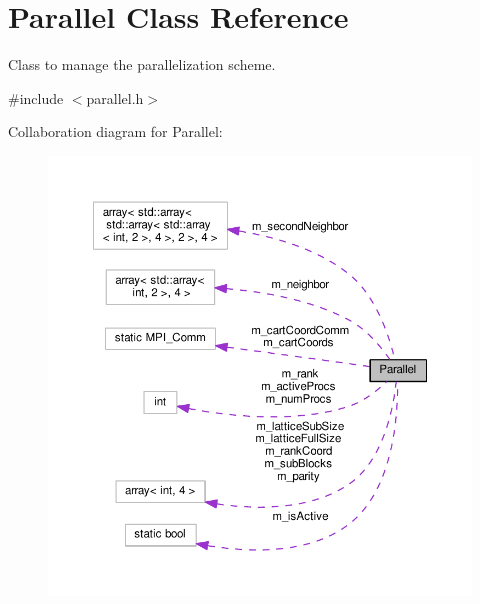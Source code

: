 \hypertarget{classParallel}{}\section{Parallel Class Reference}
\label{classParallel}


Class to manage the parallelization scheme.  




{\ttfamily \#include $<$parallel.\+h$>$}



Collaboration diagram for Parallel\+:\nopagebreak
\begin{figure}[H]
\begin{center}
\leavevmode
\includegraphics[width=350pt]{d5/d7c/classParallel__coll__graph}
\end{center}
\end{figure}
